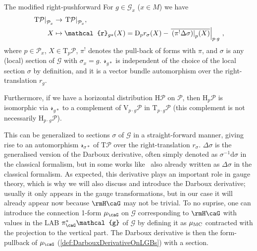 \documentclass[reqno,a4paper,oneside]{amsart}
\newcommand\mutot{\mu_\caG}
\newcommand\MC{\mu_{{\rm MC}}}
\theoremstyle{plain}
\theoremstyle{remark}
\theoremstyle{definition}
\begin{document}
\begin{propositions*}{The modified right-pushforward}
For $g \in \mathcal{G}_x$ ($x \in M$) we have
\begin{align*}
\mleft.\mathrm{T}\mathcal{P}\mright|_{\mathcal{P}_x} &\to \mleft.\mathrm{T}\mathcal{P}\mright|_{\mathcal{P}_x},\\
X 
&\mapsto 
\mathcal{r}_{g*}(X) 
=
\mathrm{D}_pr_\sigma\mleft( 
	X 
\mright)
	- \mleft.{\overline{
		\mleft. \mleft( \pi^!\Delta\sigma \mright) \mright|_p(X)
	}}\mright|_{p \cdot g}~,
\end{align*}
where $p \in \mathcal{P}_x$, $X \in \mathrm{T}_p \mathcal{P}$, $\pi^!$ denotes the pull-back of forms with $\pi$, and $\sigma$ is any (local) section of $\mathcal{G}$ with $\sigma_x = g$. $\mathcal{r}_{g*}$ is independent of the choice of the local section $\sigma$ by definition, and it is a vector bundle automorphism over the right-translation $r_g$. 

Furthermore, if we have a horizontal distribution $\mathrm{H}\mathcal{P}$ on $\mathcal{P}$, then $\mathrm{H}_p\mathcal{P}$ is isomorphic via $\mathcal{r}_{g*}$ to a complement of $\mathrm{V}_{p \cdot g} \mathcal{P}$ in $\mathrm{T}_{p \cdot g}\mathcal{P}$ (this complement is not necessarily $\mathrm{H}_{p \cdot g}\mathcal{P}$).
\end{propositions*}

This can be generalized to sections $\sigma$ of $\mathcal{G}$ in a straight-forward manner, giving rise to an automorphism $\mathcal{r}_{\sigma*}$ of $\mathrm{T}\mathcal{P}$ over the right-translation $r_\sigma$.
$\Delta\sigma$ is the generalised version of the Darboux derivative, often simply denoted as $\sigma^{-1} \mathrm{d}\sigma$ in the classical formalism, but in some works like \cite[\S 5.1, page 182ff.]{mackenzieGeneralTheory}\ also already written as $\Delta\sigma$ in the classical formalism. As expected, this derivative plays an important role in gauge theory, which is why we will also discuss and introduce the Darboux derivative; usually it only appears in the gauge transformations, but in our case it will already appear now because $\rmH \caG$ may not be trivial. To no suprise, one can introduce the connection 1-form $\mutot$ on $\mathcal{G}$ corresponding to $\rmH \caG$ with values in the LAB $\pi_\caG^*\mathcal{g}$ of $\mathcal{G}$ by defining it as $\MC$ contracted with the projection to the vertical part. The Darboux derivative is then the form-pullback of $\mutot$ (\ref{def:DarbouxDerivativeOnLGBs}) with a section.
\end{document}
